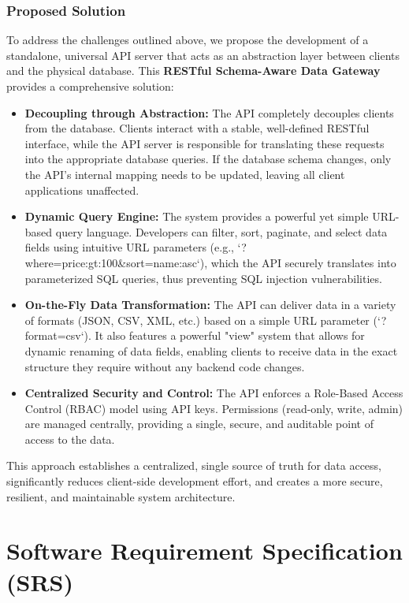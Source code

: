\documentclass[12pt, a4paper]{report}
\begin{document}
\subsection{Proposed Solution}
To address the challenges outlined above, we propose the development of a standalone, universal API server that acts as an abstraction layer between clients and the physical database. This \textbf{RESTful Schema-Aware Data Gateway} provides a comprehensive solution:
\begin{itemize}
    \item \textbf{Decoupling through Abstraction:} The API completely decouples clients from the database. Clients interact with a stable, well-defined RESTful interface, while the API server is responsible for translating these requests into the appropriate database queries. If the database schema changes, only the API's internal mapping needs to be updated, leaving all client applications unaffected.
    \item \textbf{Dynamic Query Engine:} The system provides a powerful yet simple URL-based query language. Developers can filter, sort, paginate, and select data fields using intuitive URL parameters (e.g., `?where=price:gt:100&sort=name:asc`), which the API securely translates into parameterized SQL queries, thus preventing SQL injection vulnerabilities.
    \item \textbf{On-the-Fly Data Transformation:} The API can deliver data in a variety of formats (JSON, CSV, XML, etc.) based on a simple URL parameter (`?format=csv`). It also features a powerful "view" system that allows for dynamic renaming of data fields, enabling clients to receive data in the exact structure they require without any backend code changes.
    \item \textbf{Centralized Security and Control:} The API enforces a Role-Based Access Control (RBAC) model using API keys. Permissions (read-only, write, admin) are managed centrally, providing a single, secure, and auditable point of access to the data.
\end{itemize}
This approach establishes a centralized, single source of truth for data access, significantly reduces client-side development effort, and creates a more secure, resilient, and maintainable system architecture.

\newpage
\chapter{Software Requirement Specification (SRS)}
\end{document}
